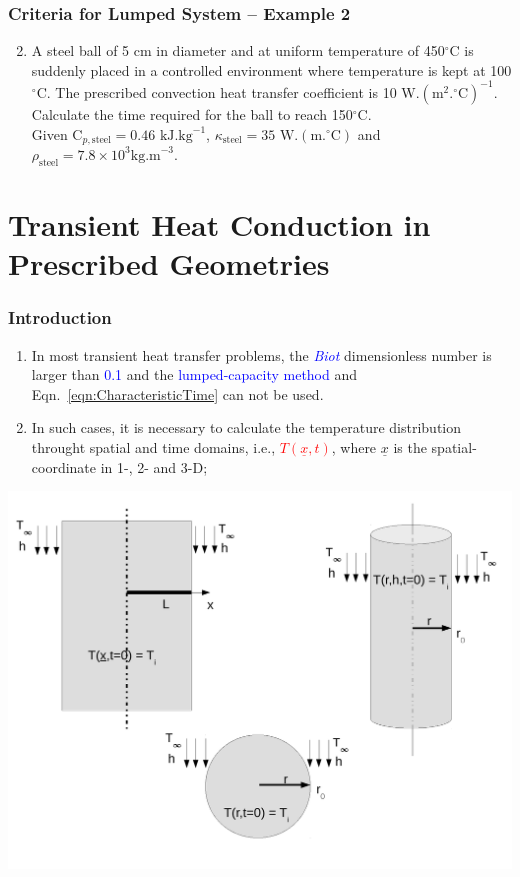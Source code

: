 \documentclass[10pt,compress]{beamer}
\newcommand{\red}{\textcolor{red}}
\newcommand{\blue}{\textcolor{blue}}
\begin{document}
\begin{frame}
 \frametitle{Criteria for Lumped System --  Example 2}
   \begin{enumerate}\setcounter{enumi}{1}%
      \item A steel ball of 5 cm in diameter and at uniform temperature of 450$^{\circ}$C is suddenly placed in a controlled environment where temperature is kept at 100$^{\circ}$C.  The prescribed convection heat transfer coefficient is 10 W.$\left(\text{m}^{2}.^{\circ}\text{C}\right)^{-1}$. Calculate the time required for the ball to reach 150$^{\circ}$C. \\
Given C$_{p,\text{steel}} = 0.46\text{ kJ.kg}^{-1}$, $\kappa_{\text{steel}}=35\text{ W.}\left(\text{m.}^{\circ}\text{C}\right)$ and $\rho_{\text{steel}}=7.8\times 10^{3}\text{kg.m}^{-3}$.
   \end{enumerate}
\end{frame}


\section{Transient Heat Conduction in Prescribed Geometries}

\begin{frame}
 \frametitle{Introduction}
   \begin{enumerate}%
     \item<1-> In most transient heat transfer problems, the \blue{\it Biot} dimensionless number is larger than \blue{0.1} and the \blue{lumped-capacity method} and Eqn.~\ref{eqn:CharacteristicTime} can not be used.
     \item<2-> In such cases, it is necessary to calculate the temperature distribution throught spatial and time domains, i.e., \red{$T\left(\underline{x},t\right)$}, where $\underline{x}$ is the spatial-coordinate in 1-, 2- and 3-D;
   \end{enumerate}

   \begin{center}
      \includegraphics[width=0.55\columnwidth,height=0.45\columnwidth,clip]{./Pics/HT_All}
   \end{center}
\end{frame}
\end{document}
